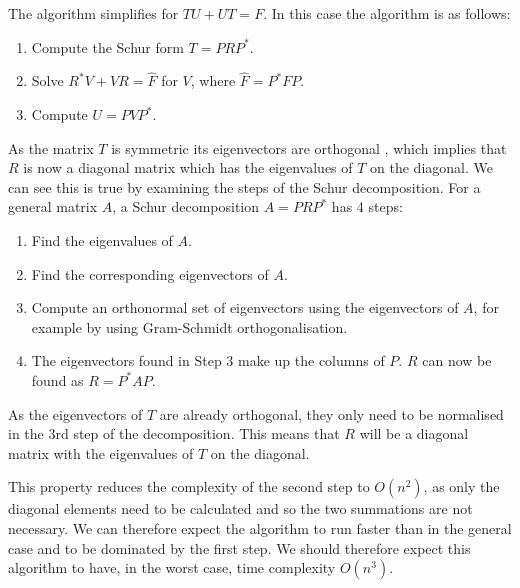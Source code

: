 \documentclass[11pt]{article}
\numberwithin{equation}{section}
\begin{document}
The algorithm simplifies for $TU+UT=F$. In this case the algorithm is as follows:
\begin{enumerate}
\item Compute the Schur form $T=PRP^*$.
\item Solve $R^*V + VR = \hat{F}$ for $V$, where $\hat{F} =  P^*FP$.
\item Compute $U=PVP^*$.
\end{enumerate}
As the matrix $T$ is symmetric its eigenvectors are orthogonal \cite{Quandt}, which implies that $R$ is now a diagonal matrix which has the eigenvalues of $T$ on the diagonal. We can see this is true by examining the steps of the Schur decomposition. For a general matrix $A$, a Schur decomposition $A=PRP^*$ has 4 steps:
\begin{enumerate}
\item Find the eigenvalues of $A$.
\item Find the corresponding eigenvectors of $A$.
\item Compute an orthonormal set of eigenvectors using the eigenvectors of $A$, for example by using Gram-Schmidt orthogonalisation.
\item The eigenvectors found in Step 3 make up the columns of $P$. $R$ can now be found as $R=P^*AP$. 
\end{enumerate}
As the eigenvectors of $T$ are already orthogonal, they only need to be normalised in the 3rd step of the decomposition. This means that $R$ will be a diagonal matrix with the eigenvalues of $T$ on the diagonal.

This property reduces the complexity of the second step to $O(n^2)$, as only the diagonal elements need to be calculated and so the two summations are not necessary. We can therefore expect the algorithm to run faster than in the general case and to be dominated by the first step. We should therefore expect this algorithm to have, in the worst case, time complexity $O(n^3)$.
\end{document}
